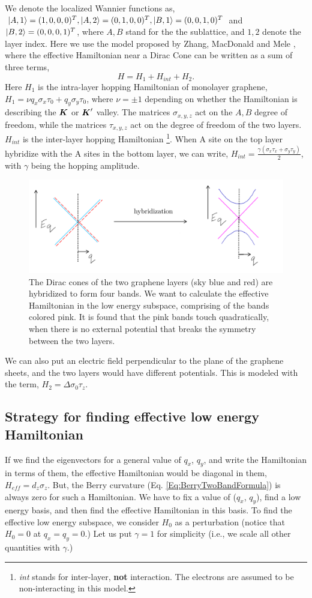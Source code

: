 \documentclass{report}
\renewcommand\vec[1]{\ensuremath\boldsymbol{#1}} %
\begin{document}
We denote the localized Wannier functions as, $\ket{A,1} = (1,0,0,0)^T, \ket{A,2} = (0,1,0,0)^T, \ket{B,1} = (0,0,1,0)^T$ and $\ket{B,2} = (0,0,0,1)^T$, where $A,B$ stand for the the sublattice, and $1,2$ denote the layer index.
Here we use the model proposed by Zhang, MacDonald and Mele \cite{Zhang10546}, where the effective Hamiltonian near a Dirac Cone can be written as a sum of three terms,
$$ H = H_1 + H_{int} + H_2. $$
Here $H_1$ is the intra-layer hopping Hamiltonian of monolayer graphene, $H_1 = \nu q_{x} \sigma_{x} \tau_{0}+q_{y} \sigma_{y} \tau_{0}$, where $\nu = \pm 1$ depending on whether the Hamiltonian is describing the $\vec{K}$ or $\vec{K}'$ valley. The matrices $\sigma_{x,y,z}$ act on the $A, B$ degree of freedom, while the matrices $\tau_{x,y,z}$ act on the degree of freedom of the two layers.
$H_{int}$ is the inter-layer hopping Hamiltonian \footnote{\textit{int} stands for inter-layer, \textbf{not} interaction. The electrons are assumed to be non-interacting in this model.}.
When A site on the top layer hybridize with the A sites in the bottom layer, we can write,
$H_{int} = \frac{\gamma\left(\sigma_{x} \tau_{x}+\sigma_{y} \tau_{y}\right)}{2}$, with $\gamma$ being the hopping amplitude.
\begin{figure}[h!]
	\centering
	\includegraphics[width=0.7\linewidth]{hybridization.pdf}
	\caption{The Dirac cones of the two graphene layers (sky blue and red) are hybridized to form four bands. We want to calculate the effective Hamiltonian in the low energy subspace, comprising of the bands colored pink. It is found that the pink bands touch quadratically, when there is no external potential that breaks the symmetry between the two layers.}
	\label{fig:hybridization}
\end{figure}
We can also put an electric field perpendicular to the plane of the graphene sheets, and the two layers would have different potentials. This is modeled with the term, $H_2 = \Delta \sigma_0 \tau_z$. 
\subsection{Strategy for finding effective low energy Hamiltonian}
If we find the eigenvectors for a general value of $q_x$, $q_y$, and write the Hamiltonian in terms of them, the effective Hamiltonian would be diagonal in them, $H_{eff} = d_z \sigma_z$. But, the Berry curvature (Eq. \eqref{Eq:BerryTwoBandFormula}) is always zero for such a Hamiltonian. We have to fix a value of ($q_x$, $q_y$), find a low energy basis, and then find the effective Hamiltonian in this basis.
To find the effective low energy subspace, we consider $H_0$ as a perturbation (notice that $H_0 = 0$ at $q_x = q_y =0$.) Let us put $\gamma = 1$ for simplicity (i.e., we scale all other quantities with $\gamma$.)
\end{document}
